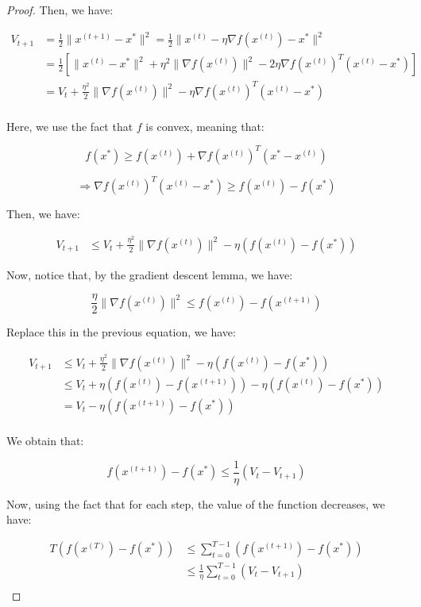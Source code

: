 \begin{proof}
    Then, we have:

    \begin{align*}
        V_{t+1} &= \frac{1}{2} \|x^{(t+1)} - x^*\|^2  = \frac{1}{2} \|x^{(t)} - \eta \nabla f(x^{(t)}) - x^*\|^2\\
                &= \frac{1}{2} \left[ \|x^{(t)} - x^*\|^2  + \eta^2 \| \nabla f(x^{(t)}) \|^2 - 2 \eta \nabla f(x^{(t)})^T (x^{(t)} - x^*) \right]\\
                &= V_t + \frac{\eta^2}{2} \| \nabla f(x^{(t)}) \|^2 - \eta \nabla f(x^{(t)})^T (x^{(t)} - x^*)\\
    \end{align*}

    Here, we use the fact that $f$ is convex, meaning that:

    $$f(x^*) \geq f(x^{(t)}) + \nabla f(x^{(t)})^T (x^* - x^{(t)})$$

    $$\Rightarrow \nabla f(x^{(t)})^T (x^{(t)} - x^*) \geq f(x^{(t)}) - f(x^*)$$

    Then, we have:

    \begin{align*}
        V_{t+1} &\leq V_t + \frac{\eta^2}{2} \| \nabla f(x^{(t)}) \|^2 - \eta (f(x^{(t)}) - f(x^*))
    \end{align*}

    Now, notice that, by the gradient descent lemma, we have:

    $$\frac{\eta}{2} \| \nabla f(x^{(t)}) \|^2 \leq f(x^{(t)}) - f(x^(t + 1))$$

    Replace this in the previous equation, we have:

    \begin{align*}
        V_{t+1} &\leq V_t + \frac{\eta^2}{2} \| \nabla f(x^{(t)}) \|^2 - \eta (f(x^{(t)}) - f(x^*))\\
                &\leq V_t + \eta (f(x^{(t)}) - f(x^{(t+1)})) - \eta (f(x^{(t)}) - f(x^*))\\
                &= V_t - \eta (f(x^{(t+1)}) - f(x^*))\\
    \end{align*}

    We obtain that:

    $$f(x^{(t+1)}) - f(x^*) \leq \frac{1}{\eta} (V_t - V_{t+1})$$

    Now, using the fact that for each step, the value of the function decreases, we have:

    \begin{align*}
        T(f(x^{(T)}) - f(x^*)) &\leq \sum_{t=0}^{T-1} (f(x^{(t+1)}) - f(x^*))\\
                               &\leq \frac{1}{\eta} \sum_{t=0}^{T-1} (V_t - V_{t+1})\\
    \end{align*}


\end{proof}
